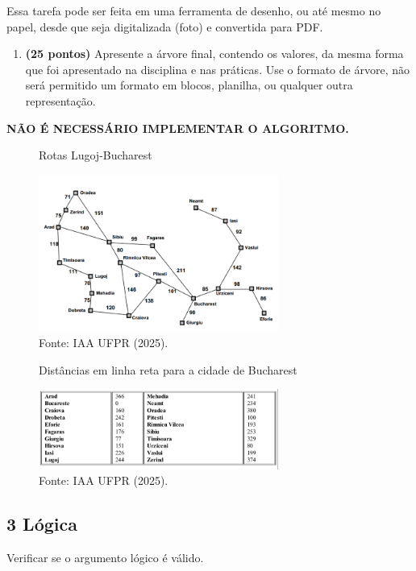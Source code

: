    Essa tarefa pode ser feita em uma ferramenta de desenho, ou até mesmo no papel, desde que seja digitalizada (foto) e convertida para PDF.
    \begin{enumerate}[label=\alph*)]
        \item \textbf{(25 pontos)} Apresente a árvore final, contendo os valores, da mesma forma que foi apresentado na disciplina e nas práticas. Use o formato de árvore, não será permitido um formato em blocos, planilha, ou qualquer outra representação.
    \end{enumerate}

    \textbf{NÃO É NECESSÁRIO IMPLEMENTAR O ALGORITMO.}
    \begin{figure}[H]
        \centering
        \caption{Rotas Lugoj-Bucharest}
        \includegraphics[width=0.7\textwidth]{apendices/fig/1_IAA001_1.png} 
        \caption*{Fonte: IAA UFPR (2025).}
    \end{figure}
    \begin{figure}[H]
        \centering
        \caption{Distâncias em linha reta para a cidade de Bucharest}
        \includegraphics[width=0.7\textwidth]{apendices/fig/1_IAA001_2.png} 
        \caption*{Fonte: IAA UFPR (2025).}
    \end{figure}

\subsection*{\textbf{3 Lógica}}
    Verificar se o argumento lógico é válido.

